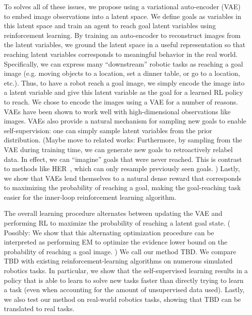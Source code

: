 To solves all of these issues, we propose using a variational auto-encoder (VAE) to embed image observations into a latent space.
We define goals as variables in this latent space and train an agent to reach goal latent variables using reinforcement learning.
By training an auto-encoder to reconstruct images from the latent variables, we ground the latent space in a useful representation so that reaching latent variables corresponds to meaningful behavior in the real world.
Specifically, we can express many ``downstream'' robotic tasks as reaching a goal image
(e.g. moving objects to a location, set a dinner table, or go to a location, etc.).
Thus, to have a robot reach a goal image, we simply encode the image into a latent variable and give this latent variable as the goal for a learned RL policy to reach.
We chose to encode the images using a VAE for a number of reasons.
VAEs have been shown to work well with high-dimensional observations like images.
VAEs also provide a natural mechanism for sampling new goals to enable self-supervision: one can simply sample latent variables from the prior distribution.
(Maybe move to related works:
Furthermore, by sampling from the VAE during training time, we can generate new goals to retroactively relabel data.
In effect, we can ``imagine'' goals that were never reached.
This is contrast to methods like HER~\cite{andrychowicz2017her}, which can only resample previously seen goals.
)
Lastly, we show that VAEs lend themselves to a natural dense reward that corresponds to maximizing the probability of reaching a goal, making the goal-reaching task easier for the inner-loop reinforcement learning algorithm.

The overall learning procedure alternates between updating the VAE and performing RL to maximize the probability of reaching a latent goal state.
(
Possibly:
We show that this alternating optimization procedure can be interpreted as performing EM to optimize the evidence lower bound on the probability of reaching a goal image.
)
We call our method TBD.
We compare TBD with existing reinforcement-learning algorithms on numerous simulated robotics tasks.
In particular, we show that the self-supervised learning results in a policy that is able to learn to solve new tasks faster than directly trying to learn a task (even when accounting for the amount of unsupervised data used).
Lastly, we also test our method on real-world robotics tasks, showing that TBD can be translated to real tasks.

